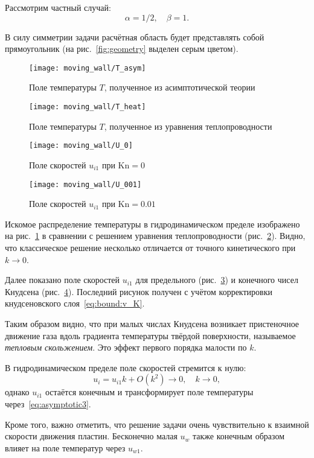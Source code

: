 \documentclass[english,russian,a4paper,10pt]{article}
\newcommand{\Kn}{\mathrm{Kn}}
\begin{document}
Рассмотрим частный случай:
\[\alpha=1/2, \quad \beta = 1. \]

В силу симметрии задачи расчётная область будет представлять собой прямоугольник
(на рис.~\ref{fig:geometry} выделен серым цветом).

\begin{figure}[ht]
	\centering
	\texttt{[image: moving\_wall/T\_asym]}
	\caption{Поле температуры \(T\), полученное из асимптотической теории}
	\label{fig:moving:T_asym}
\end{figure}

\begin{figure}[ht]
	\centering
	\texttt{[image: moving\_wall/T\_heat]}
	\caption{Поле температуры \(T\), полученное из уравнения теплопроводности}
	\label{fig:moving:T_heat}
\end{figure}

\begin{figure}[ht]
	\centering
	\texttt{[image: moving\_wall/U\_0]}
	\caption{Поле скоростей \(u_{i1}\) при \(\Kn=0\)}\label{fig:moving:fluid}
\end{figure}

\begin{figure}[ht]
	\centering
	\texttt{[image: moving\_wall/U\_001]}
	\caption{Поле скоростей \(u_{i1}\) при \(\Kn=0.01\) }\label{fig:moving:kn001}
\end{figure}

Искомое распределение температуры в гидродинамическом пределе изображено
на рис.~\ref{fig:moving:T_asym} в сравнении с решением уравнения теплопроводности (рис.~\ref{fig:moving:T_heat}).
Видно, что классическое решение несколько отличается от точного кинетического при \(k\to0\).

Далее показано поле скоростей \(u_{i1}\) для предельного (рис.~\ref{fig:moving:fluid})
и конечного чисел Кнудсена (рис.~\ref{fig:moving:kn001}).
Последний рисунок получен с учётом корректировки кнудсеновского слоя~\eqref{eq:bound:v_K}.

Таким образом видно, что при малых числах Кнудсена возникает пристеночное движение газа
вдоль градиента температуры твёрдой поверхности, называемое \textit{тепловым скольжением}.
Это эффект первого порядка малости по \(k\).

В гидродинамическом пределе поле скоростей стремится к нулю:
\[ u_i = u_{i1}k + O(k^2) \to 0, \quad k\to0,\]
однако \(u_{i1}\) остаётся конечным и трансформирует поле температуры через~\eqref{eq:asymptotic3}.

Кроме того, важно отметить, что решение задачи очень чувствительно к взаимной скорости движения пластин.
Бесконечно малая \(u_w\) также конечным образом влияет на поле температур через \(u_{w1}\).
\end{document}
